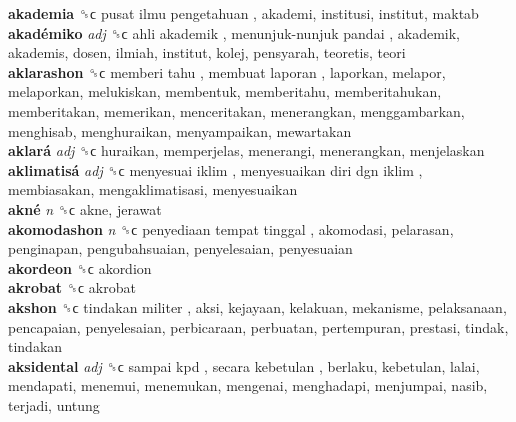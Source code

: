 \textbf{akademia} ␝ϲ   pusat ilmu pengetahuan , akademi, institusi, institut, maktab  \\
\textbf{akadémiko} \emph{adj}  ␝ϲ   ahli akademik ,  menunjuk-nunjuk pandai , akademik, akademis, dosen, ilmiah, institut, kolej, pensyarah, teoretis, teori  \\
\textbf{aklarashon} ␝ϲ   memberi tahu ,  membuat laporan , laporkan, melapor, melaporkan, melukiskan, membentuk, memberitahu, memberitahukan, memberitakan, memerikan, menceritakan, menerangkan, menggambarkan, menghisab, menghuraikan, menyampaikan, mewartakan  \\
\textbf{aklará} \emph{adj}  ␝ϲ  huraikan, memperjelas, menerangi, menerangkan, menjelaskan  \\
\textbf{aklimatisá} \emph{adj}  ␝ϲ   menyesuai iklim ,  menyesuaikan diri dgn iklim , membiasakan, mengaklimatisasi, menyesuaikan  \\
\textbf{akné} \emph{n}  ␝ϲ  akne, jerawat  \\
\textbf{akomodashon} \emph{n}  ␝ϲ   penyediaan tempat tinggal , akomodasi, pelarasan, penginapan, pengubahsuaian, penyelesaian, penyesuaian  \\
\textbf{akordeon} ␝ϲ  akordion  \\
\textbf{akrobat} ␝ϲ  akrobat  \\
\textbf{akshon} ␝ϲ   tindakan militer , aksi, kejayaan, kelakuan, mekanisme, pelaksanaan, pencapaian, penyelesaian, perbicaraan, perbuatan, pertempuran, prestasi, tindak, tindakan  \\
\textbf{aksidental} \emph{adj}  ␝ϲ   sampai kpd ,  secara kebetulan , berlaku, kebetulan, lalai, mendapati, menemui, menemukan, mengenai, menghadapi, menjumpai, nasib, terjadi, untung  \\

